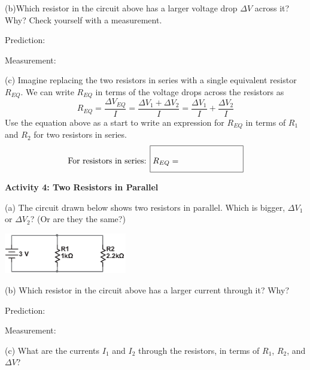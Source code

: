(b)Which resistor in the circuit above has a larger voltage drop $\Delta V$ across it?   Why?  Check yourself with a measurement.  

\vspace{0.2 in}
\hspace{0.4 in} Prediction:
\vspace{0.2 in}

\hspace{0.4 in} Measurement:  
\vspace{0.2 in}

(c) Imagine replacing the two resistors in series with a single equivalent resistor $R_{EQ}$.  We can write $R_{EQ}$ in terms of the voltage drops across the resistors as
\begin{displaymath}
R_{EQ} = \frac{\Delta V_{EQ}}{I}= \frac{\Delta V_1 +\Delta V_2 }{I}=\frac{\Delta V_1}{I} + \frac{\Delta V_2}{I}
\end{displaymath}
Use the equation above as a start to write an expression for $R_{EQ}$ in terms of $R_1$ and $R_2$ for two resistors in series.
\begin{displaymath}
\textrm{For resistors in series: } \boxed{R_{EQ} = \phantom{\rule[-0.1in]{1.0in}{.35in}}}
\end{displaymath}

\textbf{Activity 4: Two Resistors in Parallel} \par
\nopagebreak
(a)  The circuit drawn below shows two resistors in parallel.  Which is bigger, $\Delta V_1$ or $\Delta V_2$? (Or are they the same?)

\hspace{0.5 in}\includegraphics[width=0.4\textwidth]{electric_circuits2/circ_diag5_bw.eps}
\vspace{0.2 in}

\pagebreak
(b) Which resistor in the circuit above has a larger current through it?   Why? 
 
\vspace{0.2 in}
\hspace{0.4 in} Prediction:
\answerspace{0.2 in}

\hspace{0.4 in} Measurement:  
\answerspace{0.2 in}

(c) What are the currents $I_1$ and $I_2$ through the resistors, in terms of $R_1$, $R_2$, and  $\Delta V$? 
\answerspace{0.6in}


